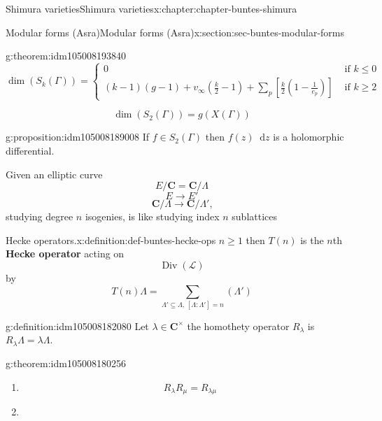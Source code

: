 \documentclass[oneside,10pt,]{book}
\newcommand{\terminology}[1]{\textbf{#1}}
\numberwithin{equation}{section}
\newcommand{\diff}{\mathop{}\!\mathrm{d}}
\newcommand{\CC}{\mathbf{C}}
\DeclareMathOperator{\divisors}{Div}
\newcommand{\amp}{&}
\begin{document}
\begin{chapterptx}{Shimura varieties}{}{Shimura varieties}{}{}{x:chapter:chapter-buntes-shimura}
\begin{sectionptx}{Modular forms (Asra)}{}{Modular forms (Asra)}{}{}{x:section:sec-buntes-modular-forms}
\begin{theorem}{}{}{g:theorem:idm105008193840}
\begin{equation*}
\dim(S_k(\Gamma)) =
\begin{cases}
0 \amp \text{ if } k \le 0 \\
(k-1)(g-1) + v_\infty (\frac k2 - 1) + \sum_p [\frac k2 (1- \frac{1}{e_p})] \amp \text{ if } k \ge 2
\end{cases}
\end{equation*}
%
\end{theorem}
%
\begin{equation*}
\dim(S_2(\Gamma)) = g(X(\Gamma))
\end{equation*}
%
\begin{proposition}{}{}{g:proposition:idm105008189008}%
If \(f \in S_2(\Gamma)\) then \(f(z) \diff z\) is a holomorphic differential.%
\end{proposition}
Given an elliptic curve%
\begin{equation*}
E/  \CC = \CC/\Lambda
\end{equation*}
%
\begin{equation*}
E \to E'
\end{equation*}
%
\begin{equation*}
\CC/\Lambda \to \CC/\Lambda'\text{,}
\end{equation*}
studying degree \(n\) isogenies, is like studying index  \(n \) sublattices%
\begin{definition}{Hecke operators.}{x:definition:def-buntes-hecke-ops}%
\(n \ge 1\) then \(T(n)\) is the  \(n\)th \terminology{Hecke operator} acting on%
\begin{equation*}
\divisors (\mathcal L)
\end{equation*}
by%
\begin{equation*}
T(n) \Lambda = \sum_{\Lambda' \subseteq \Lambda,\,[\Lambda : \Lambda'] = n} (\Lambda')
\end{equation*}
%
\end{definition}
\begin{definition}{}{g:definition:idm105008182080}%
Let \(\lambda \in \CC^\times\) the homothety operator \(R_\lambda\) is \(R_\lambda \Lambda = \lambda\Lambda\).%
\end{definition}
\begin{theorem}{}{}{g:theorem:idm105008180256}%
%
\begin{enumerate}
\item{}%
\begin{equation*}
R_\lambda R_\mu = R_{\lambda\mu}
\end{equation*}
%
\item{}%

\end{enumerate}
\end{theorem}
\end{sectionptx}
\end{chapterptx}
\end{document}
